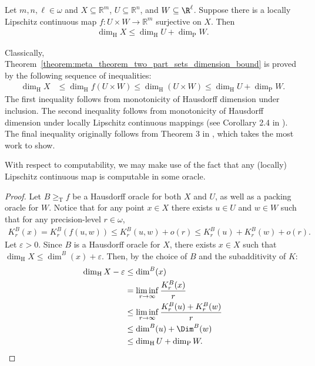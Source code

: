 \begin{theorem}
    Let $m, n, \ell\in \omega$ and $X \subseteq \mathbb{R}^m$, $U \subseteq \mathbb{R}^n$, and $W \subseteq \R^\ell$. Suppose there is a locally Lipschitz continuous map $f: U \times W \to \mathbb{R}^m$ surjective on $X$. Then
    \begin{align*}
        \dim_{\operatorname{H}} X \leq \dim_{\operatorname{H}} U + \dim_{\operatorname{P}} W.
    \end{align*}
    \label{theorem:meta_theorem_two_part_sets_dimension_bound}
\end{theorem}
Classically, Theorem~\ref{theorem:meta_theorem_two_part_sets_dimension_bound} is proved by the following sequence of inequalities:
\begin{align*}
    \dim_{\operatorname{H}} X &\leq \dim_{\operatorname{H}} f(U \times W) \leq \dim_{\operatorname{H}}(U \times W) \leq \dim_{\operatorname{H}} U + \dim_{\operatorname{P}} W.
\end{align*}
The first inequality follows from monotonicity of Hausdorff dimension under inclusion. The second inequality follows from monotonicity of Hausdorff dimension under locally Lipschitz continuous mappings (see Corollary 2.4 in \cite{Fal90}). The final inequality originally follows from Theorem 3 in \cite{Tri82}, which takes the most work to show.

With respect to computability, we may make use of the fact that any (locally) Lipschitz continuous map is computable in some oracle.

\begin{proof}
    Let $B \geq_{\operatorname{T}} f$ be a Hausdorff oracle for both $X$ and $U$, as well as a packing oracle for $W$. Notice that for any point $x \in X$ there exists $u \in U$ and $w \in W$ such that for any precision-level $r \in \omega$,
    \begin{align*}
        K^B_r(x) = K^B_r(f(u, w)) \leq K^B_r(u, w) + o(r) \leq K^B_r(u) + K^B_r(w) + o(r).
    \end{align*}
    Let $\varepsilon > 0$. Since $B$ is a Hausdorff oracle for $X$, there exists $x \in X$ such that $\dim_{\operatorname{H}} X \leq \dim^B(x) + \varepsilon$. Then, by the choice of $B$ and the subadditivity of $K$:
    \begin{align*}
        \dim_{\operatorname{H}} X - \varepsilon
        &\leq \dim^B(x)\\
        &= \liminf_{r \to \infty} \frac{K^B_r(x)}{r}\\
        &\leq \liminf_{r \to \infty} \frac{K^B_r(u) + K^B_r(w)}{r}\\
        &\leq \dim^B(u) + \Dim^B(w)\\
        &\leq \dim_{\operatorname{H}} U + \dim_{\operatorname{P}} W.
    \end{align*}
\end{proof}

